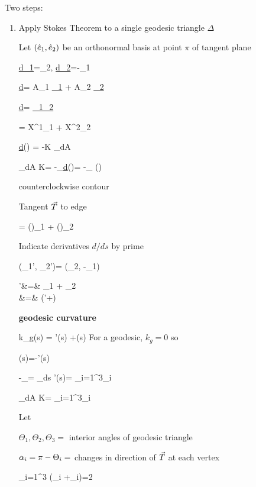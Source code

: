 Two steps: 
\begin{enumerate}

\item Apply Stokes Theorem to
a single geodesic triangle $\Delta$

Let
$({\hat{e}}_1, {\hat{e}}_2)$ be an
orthonormal basis at point
$\pi$ of tangent plane

\beq
\ul{d\hate_1}=\ul{\omega}\hate_2,
\quad
\ul{d\hate_2}=-\ul{\omega}\hate_1
\eeq

\beq
\ul{d\omega}= A_1 \ul{\chi_1}
+
A_2 \ul{\chi_2}
\eeq

\beq
\ul{d\omega}=
\ul{\chi_1}\wedge\ul{\chi_2}
\eeq

\beq
\vecX = X^1\hate_1 + X^2\hate_2
\eeq

\beq
\ul{d\omega}(\vecX)
=
-K _{dA}
\eeq

\beq
\iint_\Delta dA\; K=
-\iint_\Delta \ul{d\omega}(\vecX)=
-\oint_{\partial \Delta}
\ul{\omega}(\vecX)
\eeq

counterclockwise contour

Tangent ${\vec{T}}$ to edge

\beq
\vecT = \cos(\phi)\hate_1 +
\sin(\phi)\hate_2
\eeq

Indicate derivatives $d/ds$ by prime

\beq
(\hate_1', \hate_2')=
\omega(\hate_2, -\hate_1)
\eeq

\beqa
\vecT\;'&=&
\hate_1
+ 
\hate_2
\\
&=&
(\phi'+\omega)
\eeqa

{\bf geodesic curvature}

\beq
k_g(s) = \phi'(s) +\omega(s)
\eeq
For a geodesic, $k_g=0$ so

\beq
\omega(s)=-\phi'(s)
\eeq

\beq
-\oint_{\partial\Delta}\omega=
\oint_{\partial\Delta }ds\; \phi'(s)=
\sum_{i=1}^3\Delta \phi_i
\eeq

\beq
\iint_\Delta dA\; K=
\sum_{i=1}^3\Delta \phi_i
\eeq

Let 

$\Theta_1, \Theta_2, \Theta_3=$
interior angles of geodesic triangle

$\alpha_i=\pi-\Theta_i=$ changes 
in direction of ${\vec{T}}$
at each vertex

\beq
\sum_{i=1}^3
(\Delta \phi_i +\alp_i)=2\pi
\eeq


\end{enumerate}

